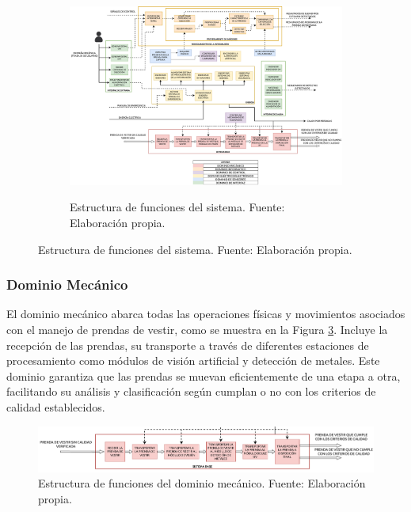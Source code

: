 \begin{figure}
	\begin{figure}[H]
		\centering
		\includegraphics[width=\textwidth]{img/ESTRUCTURA_DE_FUNCIONES.drawio.pdf}
		\label{fig:ESTRUCTURA_DE_FUNCIONES}
		\caption[Estructura de funciones del sistema.]{Estructura de funciones del sistema. Fuente: Elaboración propia.}
	\end{figure}
\end{figure}

\subsubsection{Dominio Mecánico}

El dominio mecánico abarca todas las operaciones físicas y movimientos asociados con el manejo de prendas de vestir, como se muestra en la Figura \ref{fig:EF_DM}. Incluye la recepción de las prendas, su transporte a través de diferentes estaciones de procesamiento como módulos de visión artificial y detección de metales. Este dominio garantiza que las prendas se muevan eficientemente de una etapa a otra, facilitando su análisis y clasificación según cumplan o no con los criterios de calidad establecidos.

\begin{figure}[h]
	\centering
	\includegraphics[width=\textwidth]{img/EF_DM.pdf}
	\caption[Estructura de funciones del dominio mecánico.]{Estructura de funciones del dominio mecánico. Fuente: Elaboración propia.}
	\label{fig:EF_DM}
\end{figure}

